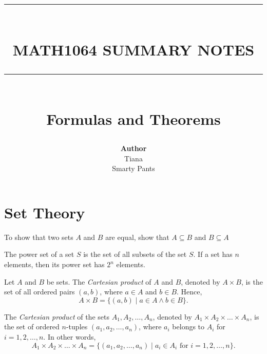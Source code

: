\documentclass{article}
\newcommand{\HRule}[1]{\rule{\linewidth}{#1}}
\begin{document}

\title{ \normalsize \textsc{}
		\\ [2.0cm]
		\HRule{1.5pt} \\
		\LARGE \textbf{\uppercase{Math1064 Summary Notes}}
		\HRule{2.0pt} \\ [0.6cm] \LARGE{Formulas and Theorems} \vspace*{10\baselineskip}}
\date{}
\author{\textbf{Author} \\ 
		Tiana \\
		Smarty Pants}

\maketitle
\newpage

\tableofcontents
\newpage


\section{Set Theory}
\begin{theorem}
    To show that two sets \(A\) and \(B\) are equal, show that \( A \subseteq B\) and \( B \subseteq A\)
\end{theorem}
\begin{theorem}
    The power set of a set \(S\) is the set of all subsets of the set \(S\). 
    If a set has \( n \) elements, then its power set has \( 2^n \) elements.
\end{theorem}
\begin{definition}
    Let \( A \) and \( B \) be sets. The \textit{Cartesian product} of \( A \) and \( B \), denoted by \( A \times B \), is the set of all ordered pairs \( (a, b) \), where \( a \in A \) and \( b \in B \). Hence,
    \[
    A \times B = \{ (a, b) \mid a \in A \land b \in B \}.
    \]
\end{definition}
\begin{definition}
    The \textit{Cartesian product} of the sets \( A_1, A_2, \dots, A_n \), denoted by \( A_1 \times A_2 \times \dots \times A_n \), is the set of ordered \( n \)-tuples \( (a_1, a_2, \dots, a_n) \), where \( a_i \) belongs to \( A_i \) for \( i = 1, 2, \dots, n \). In other words,
    \[
    A_1 \times A_2 \times \dots \times A_n = \{ (a_1, a_2, \dots, a_n) \mid a_i \in A_i \text{ for } i = 1, 2, \dots, n \}.
    \]
\end{definition}
\end{document}
